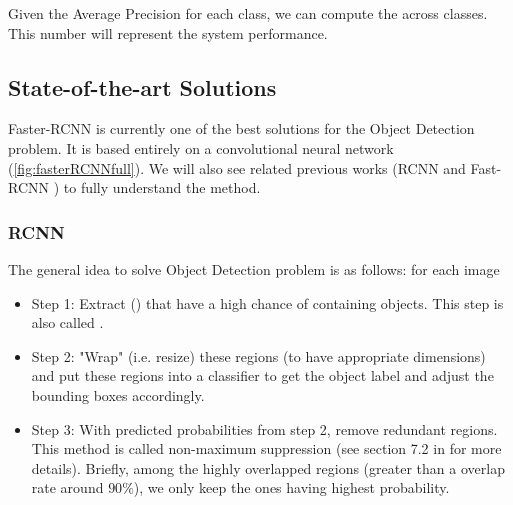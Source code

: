 Given the Average Precision for each class, we can compute the  across classes. This number will represent the system performance.

\subsection{State-of-the-art Solutions}
Faster-RCNN \cite{DBLP:journals/corr/RenHG015} is currently one of the best solutions for the Object Detection problem. It is based entirely on a convolutional neural network (\ref{fig:fasterRCNNfull}). We will also see related previous works (RCNN \cite{DBLP:journals/corr/GirshickDDM13} and Fast-RCNN \cite{DBLP:journals/corr/Girshick15}) to fully understand the method.

\subsubsection{RCNN}
The general idea to solve Object Detection problem is as follows: for each image
\begin{itemize}
	\item Step 1: Extract  () that have a high chance of containing objects. This step is also called .
	\item Step 2: "Wrap" (i.e. resize) these regions (to have appropriate dimensions) and put these regions into a classifier to get the object label and adjust the bounding boxes accordingly.
	\item Step 3: With predicted probabilities from step 2, remove redundant regions. This method is called non-maximum suppression (see section 7.2 in \cite{Felzenszwalb:2010:ODD:1850486.1850574} for more details). Briefly, among the highly overlapped regions (greater than a overlap rate around $90\%$), we only keep the ones having highest probability.
\end{itemize}

